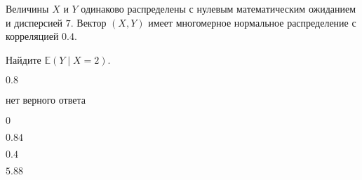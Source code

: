 
\begin{question}
Величины \(X\) и \(Y\) одинаково распределены с нулевым математическим
ожиданием и дисперсией \(7\). Вектор \((X, Y)\) имеет многомерное
нормальное распределение с корреляцией \(0.4\).

Найдите \(\mathbb{E}(Y\mid X = 2)\).
\begin{answerlist}
  \item \(0.8\)
  \item нет верного ответа
  \item \(0\)
  \item \(0.84\)
  \item \(0.4\)
  \item \(5.88\)
\end{answerlist}
\end{question}


